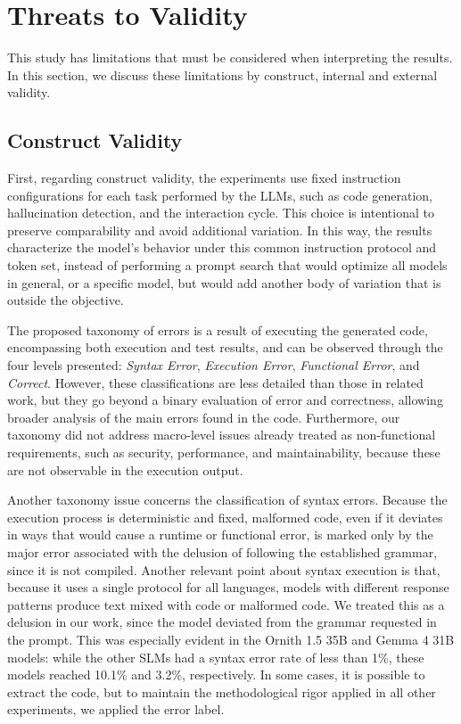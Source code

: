 \section{Threats to Validity}
This study has limitations that must be considered when interpreting the results. In this section, we discuss these limitations by construct, internal and external validity.

\subsection{Construct Validity}
First, regarding construct validity, the experiments use fixed instruction configurations for each task performed by the LLMs, such as code generation, hallucination detection, and the interaction cycle. This choice is intentional to preserve comparability and avoid additional variation. In this way, the results characterize the model's behavior under this common instruction protocol and token set, instead of performing a prompt search that would optimize all models in general, or a specific model, but would add another body of variation that is outside the objective.

The proposed taxonomy of errors is a result of executing the generated code, encompassing both execution and test results, and can be observed through the four levels presented: \emph{Syntax Error}, \emph{Execution Error}, \emph{Functional Error}, and \emph{Correct}. However, these classifications are less detailed than those in related work, but they go beyond a binary evaluation of error and correctness, allowing broader analysis of the main errors found in the code. Furthermore, our taxonomy did not address macro-level issues already treated as non-functional requirements, such as security, performance, and maintainability, because these are not observable in the execution output.

Another taxonomy issue concerns the classification of syntax errors. Because the execution process is deterministic and fixed, malformed code, even if it deviates in ways that would cause a runtime or functional error, is marked only by the major error associated with the delusion of following the established grammar, since it is not compiled. Another relevant point about syntax execution is that, because it uses a single protocol for all languages, models with different response patterns produce text mixed with code or malformed code. We treated this as a delusion in our work, since the model deviated from the grammar requested in the prompt. This was especially evident in the Ornith 1.5 35B and Gemma 4 31B models: while the other SLMs had a syntax error rate of less than 1\%, these models reached 10.1\% and 3.2\%, respectively. In some cases, it is possible to extract the code, but to maintain the methodological rigor applied in all other experiments, we applied the error label.

